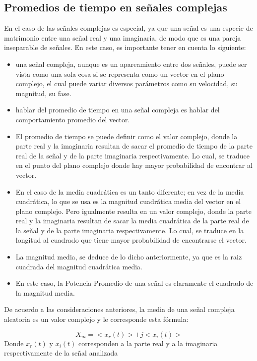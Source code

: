 \subsection{Promedios de tiempo en señales complejas}
En el caso de las señales complejas es especial, ya que una señal es una especie de matrimonio entre una señal real y una imaginaria, de modo que es una pareja inseparable de señales. En este caso, es importante tener en cuenta lo siguiente:
\begin{itemize}
    \item una señal compleja, aunque es un apareamiento entre dos señales, puede ser vista como una sola cosa si se representa como un vector en el plano complejo, el cual puede variar diversos parámetros como su velocidad, su magnitud, su fase.
    \item hablar del promedio de tiempo en una señal compleja es hablar del comportamiento promedio del vector.\\
    \item El promedio de tiempo se puede definir como el valor complejo, donde la parte real y la imaginaria resultan de sacar el promedio de tiempo de la parte real de la señal y de la parte imaginaria respectivamente. Lo cual, se traduce en el punto del plano complejo donde hay mayor probabilidad de encontrar al vector.
    \item En el caso de la media cuadrática es un tanto diferente; en vez de la media cuadrática, lo que se usa es la magnitud cuadrática media del vector en el plano complejo. Pero igualmente resulta en un valor complejo, donde la parte real y la imaginaria resultan de sacar la media cuadrática de la parte real de la señal y de la parte imaginaria respectivamente. Lo cual, se traduce en la longitud al cuadrado que tiene mayor probabilidad de encontrarse el vector.
    \item La magnitud media, se deduce de lo dicho anteriormente, ya que es la raiz cuadrada del magnitud cuadrática media.
    \item En este caso, la Potencia Promedio de una señal es claramente el cuadrado de la magnitud media.
\end{itemize}

De acuerdo a las consideraciones anteriores, la media de una señal compleja aleatoria es un valor complejo y le corresponde esta fórmula:

 	\begin{equation} \label{equ_veintiseis}
		 X_{m} = <x_{r}(t)>+j<x_{i}(t)> 
	\end{equation}
Donde $x_{r}(t)$ y $x_{i}(t)$ corresponden a la parte real y a la imaginaria respectivamente de la señal analizada 

